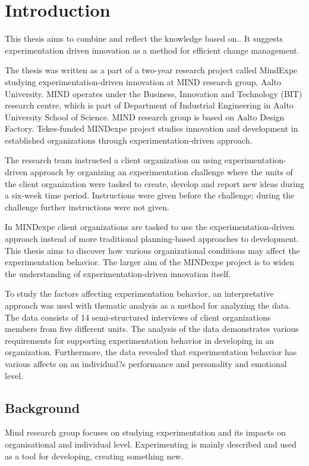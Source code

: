 \chapter{Introduction}
This thesis aims to combine and reflect the knowledge based on.. It suggests experimentation driven innovation as a method for efficient change management. 

The thesis was written as a part of a two-year research project called MindExpe studying experimentation-driven innovation at MIND research group, 
Aalto University. MIND operates under the Business, Innovation and Technology (BIT) research centre, which is part of Department of Industrial Engineering 
in Aalto University School of Science. MIND research group is based on Aalto Design Factory. Tekes-funded MINDexpe project studies innovation and development 
in established organizations through experimentation-driven approach. 

The research team instructed a client organization on using experimentation-driven approach by organizing an experimentation challenge where the units of the 
client organization were tasked to create, develop and report new ideas during a six-week time period. Instructions were given before the challenge; during 
the challenge further instructions were not given. 

In MINDexpe client organizations are tasked to use the experimentation-driven approach instead of more traditional planning-based approaches to development. 
This thesis aims to discover how various organizational conditions may affect the experimentation behavior. The larger aim of the MINDexpe project is to 
widen the understanding of experimentation-driven innovation itself.

To study the factors affecting experimentation behavior, an interpretative approach was used with thematic analysis as a method for analyzing the data. 
The data consists of 14 semi-structured interviews of client organizations members from five different units. The analysis of the data demonstrates various 
requirements for supporting experimentation behavior in developing in an organization. Furthermore, the data revealed that experimentation behavior has various 
affects on an individual?s performance and personality and emotional level. 

\section{Background}
Mind research group focuses on studying experimentation and its impacts on organisational and individual level. Experimenting is mainly described and used as 
a tool for developing, creating something new. 

